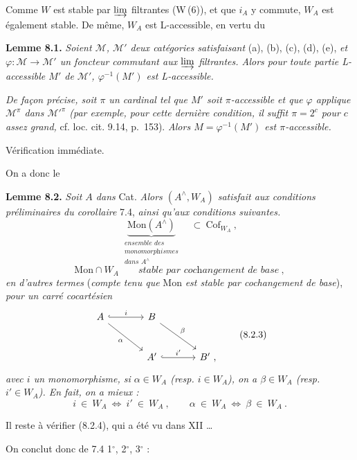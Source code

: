 \documentclass[11pt]{article}
\newcommand{\printedpage}[1]{\marginpar{\footnotesize p.~#1}}
\newcommand{\msp}[1]{\marginpar{\footnotesize [#1]}}
\newcommand{\Mon}{\mathrm{Mon}}
\newcommand{\Cof}{\mathrm{Cof}}
\newcommand{\chap}{^{\wedge}}
\begin{document}
Comme $W$ est stable par $\varinjlim$ filtrantes (W\,(6)), et que $i_A$ y commute, $W_A$ est également stable. De même, $W_A$ est L-accessible, en vertu du

\textbf{Lemme 8.1.} \textit{Soient $\mathcal{M}$, $\mathcal{M}'$ deux catégories satisfaisant} (a), (b), (c), (d), (e), \textit{et $\varphi:\mathcal{M}\longrightarrow\mathcal{M}'$ un foncteur commutant aux $\varinjlim$ filtrantes. Alors pour toute partie L-accessible $M'$ de $\mathcal{M}'$, $\varphi^{-1}(M')$ est L-accessible.}

\msp{page 103}
\textit{De façon précise, soit $\pi$ un cardinal tel que $M'$ soit $\pi$-accessible et que $\varphi$ applique $\mathcal{M}^{\pi}$ dans $\mathcal{M}'^{\pi}$ (par exemple, pour cette dernière condition, il suffit $\pi=2^c$ pour $c$ assez grand,} cf. loc. cit. 9.14, p.~153). \textit{Alors $M=\varphi^{-1}(M')$ est $\pi$-accessible.}

Vérification immédiate.

On a donc le

\printedpage{57}
\textbf{Lemme 8.2.} \textit{Soit $A$ dans} Cat. \textit{Alors $(A\chap,W_A)$ satisfait aux conditions préliminaires du corollaire} 7.4, \textit{ainsi qu'aux conditions suivantes.}
\[
\underbrace{\Mon(A\chap)}_{\substack{\textit{ensemble des}\\ \textit{monomorphismes}\\ \textit{dans } A\chap}} \quad\subset\ \Cof_{W_A}\ ,
\tag*{(8.2.1)}
\]
\[
\Mon\cap W_A \qquad \textit{stable par cochangement de base}\ ,
\tag*{(8.2.2)}
\]
\textit{en d'autres termes} (\textit{compte tenu que} Mon \textit{est stable par cochangement de base}), \textit{pour un carré cocartésien}
\[
\begin{tikzcd}[row sep=large, column sep=large]
A \arrow[r, hook, "i"] \arrow[dr, "\alpha"'] & B \arrow[dr, "\beta"] & \\
& A' \arrow[r, hook, "i'"] & B'\ ,
\end{tikzcd}
\tag*{(8.2.3)}
\]
\textit{avec $i$ un monomorphisme, si $\alpha\in W_A$ (resp. $i\in W_A$), on a $\beta\in W_A$ (resp. $i'\in W_A$). En fait, on a mieux :}
\[
i\ \in\ W_A \ \Longleftrightarrow\ i'\ \in\ W_A\ , \qquad \alpha\ \in\ W_A \ \Longleftrightarrow\ \beta\ \in\ W_A\ .
\tag*{(8.2.4)}
\]

\msp{page 104}
Il reste à vérifier (8.2.4), qui a été vu dans XII \ldots

On conclut donc de 7.4 1$^\circ$, 2$^\circ$, 3$^\circ$ :
\end{document}
